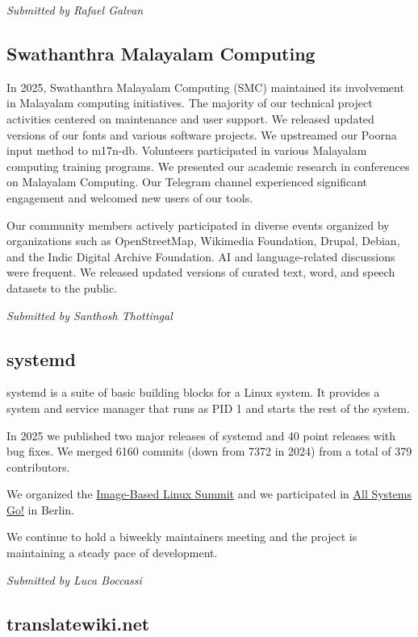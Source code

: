 \documentclass[a4paper]{report}
\begin{document}
{\em Submitted by Rafael Galvan}

\subsection{Swathanthra Malayalam Computing}

In 2025, Swathanthra Malayalam Computing (SMC) maintained its involvement in Malayalam computing initiatives. The majority of our technical project activities centered on maintenance and user support. We released updated versions of our fonts and various software projects. We upstreamed our Poorna input method to m17n-db. Volunteers participated in various Malayalam computing training programs. We presented our academic research in conferences on Malayalam Computing. Our Telegram channel experienced significant engagement and welcomed new users of our tools.

Our community members actively participated in diverse events organized by organizations such as OpenStreetMap, Wikimedia Foundation, Drupal, Debian, and the Indic Digital Archive Foundation. AI and language-related discussions were frequent. We released updated versions of curated text, word, and speech datasets to the public.

{\em Submitted by Santhosh Thottingal}

\subsection{systemd}

systemd is a suite of basic building blocks for a Linux system. It provides a system and service manager that runs as PID 1 and starts the rest of the system.

In 2025 we published two major releases of systemd and 40 point releases with bug fixes. We merged 6160 commits (down from 7372 in 2024) from a total of 379 contributors.

We organized the \href{https://uapi-group.org/conferences/minutes/2025-10-02__image-based-linux-summit/}{Image-Based Linux Summit} and we participated in \href{https://cfp.all-systems-go.io/all-systems-go-2025/schedule/}{All Systems Go!} in Berlin.

We continue to hold a biweekly maintainers meeting and the project is maintaining a steady pace of development.

{\em Submitted by Luca Boccassi}

\subsection{translatewiki.net}
\end{document}
